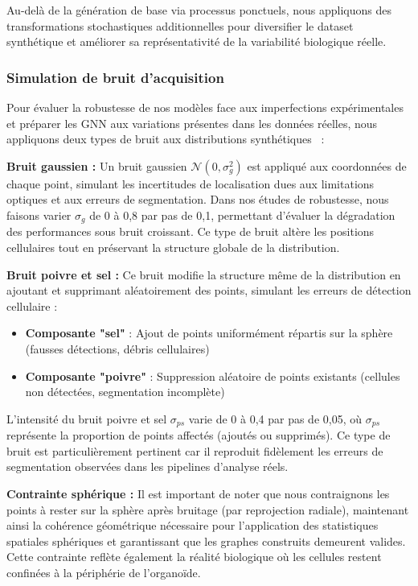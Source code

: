 Au-delà de la génération de base via processus ponctuels, nous appliquons des transformations stochastiques additionnelles pour diversifier le dataset synthétique et améliorer sa représentativité de la variabilité biologique réelle.

\subsubsection{Simulation de bruit d'acquisition}

Pour évaluer la robustesse de nos modèles face aux imperfections expérimentales et préparer les GNN aux variations présentes dans les données réelles, nous appliquons deux types de bruit aux distributions synthétiques~\cite{Martin2025GRETSI2} :

\textbf{Bruit gaussien :}
Un bruit gaussien $\mathcal{N}(0, \sigma_g^2)$ est appliqué aux coordonnées de chaque point, simulant les incertitudes de localisation dues aux limitations optiques et aux erreurs de segmentation. Dans nos études de robustesse, nous faisons varier $\sigma_g$ de 0 à 0,8 par pas de 0,1, permettant d'évaluer la dégradation des performances sous bruit croissant. Ce type de bruit altère les positions cellulaires tout en préservant la structure globale de la distribution.

\textbf{Bruit poivre et sel :}
Ce bruit modifie la structure même de la distribution en ajoutant et supprimant aléatoirement des points, simulant les erreurs de détection cellulaire :
\begin{itemize}
    \item \textbf{Composante "sel"} : Ajout de points uniformément répartis sur la sphère (fausses détections, débris cellulaires)
    \item \textbf{Composante "poivre"} : Suppression aléatoire de points existants (cellules non détectées, segmentation incomplète)
\end{itemize}

L'intensité du bruit poivre et sel $\sigma_{ps}$ varie de 0 à 0,4 par pas de 0,05, où $\sigma_{ps}$ représente la proportion de points affectés (ajoutés ou supprimés). Ce type de bruit est particulièrement pertinent car il reproduit fidèlement les erreurs de segmentation observées dans les pipelines d'analyse réels.

\textbf{Contrainte sphérique :}
Il est important de noter que nous contraignons les points à rester sur la sphère après bruitage (par reprojection radiale), maintenant ainsi la cohérence géométrique nécessaire pour l'application des statistiques spatiales sphériques et garantissant que les graphes construits demeurent valides. Cette contrainte reflète également la réalité biologique où les cellules restent confinées à la périphérie de l'organoïde.

